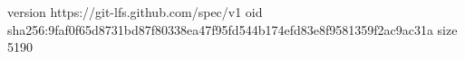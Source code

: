 version https://git-lfs.github.com/spec/v1
oid sha256:9faf0f65d8731bd87f80338ea47f95fd544b174efd83e8f9581359f2ac9ac31a
size 5190
